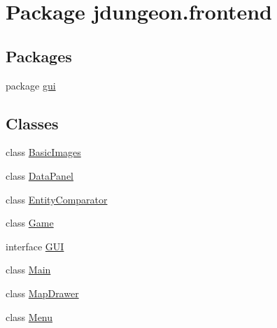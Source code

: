 \hypertarget{namespacejdungeon_1_1frontend}{
\section{Package jdungeon.frontend}
\label{namespacejdungeon_1_1frontend}
}
\subsection*{Packages}
\begin{DoxyCompactItemize}
\item 
package \hyperlink{namespacejdungeon_1_1frontend_1_1gui}{gui}
\end{DoxyCompactItemize}
\subsection*{Classes}
\begin{DoxyCompactItemize}
\item 
class \hyperlink{classjdungeon_1_1frontend_1_1_basic_images}{BasicImages}
\item 
class \hyperlink{classjdungeon_1_1frontend_1_1_data_panel}{DataPanel}
\item 
class \hyperlink{classjdungeon_1_1frontend_1_1_entity_comparator}{EntityComparator}
\item 
class \hyperlink{classjdungeon_1_1frontend_1_1_game}{Game}
\item 
interface \hyperlink{interfacejdungeon_1_1frontend_1_1_g_u_i}{GUI}
\item 
class \hyperlink{classjdungeon_1_1frontend_1_1_main}{Main}
\item 
class \hyperlink{classjdungeon_1_1frontend_1_1_map_drawer}{MapDrawer}
\item 
class \hyperlink{classjdungeon_1_1frontend_1_1_menu}{Menu}
\end{DoxyCompactItemize}
